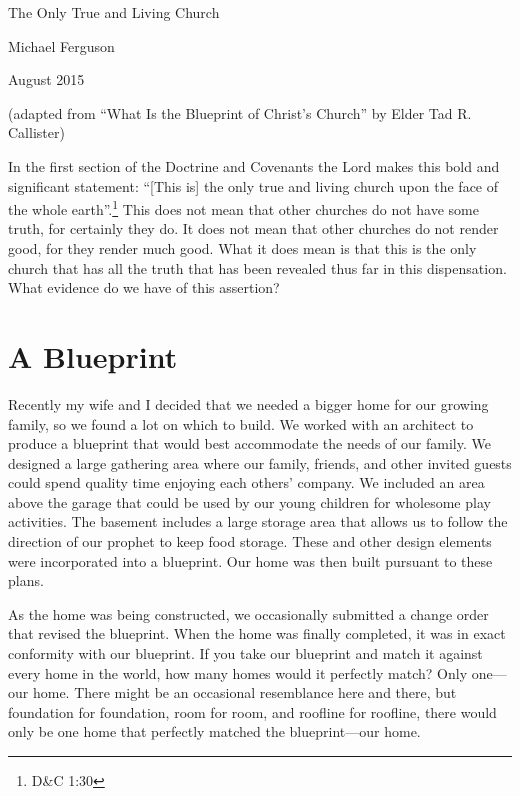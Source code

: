 \documentclass{article}
\begin{document}
\centerline{\sc \large The Only True and Living Church}
\vspace{.5pc}
\centerline{\sc Michael Ferguson}
\centerline{ August 2015}
\vspace{.5pc}
\centerline{\scriptsize (adapted from ``What Is the Blueprint of Christ's Church'' by Elder Tad R. Callister)}
\vspace{6pc}

In the first section of the Doctrine and Covenants the Lord makes this bold and significant statement: ``[This is] the only true and living church upon the face of the whole earth''.\footnote{D\&C 1:30} This does not mean that other churches do not have some truth, for certainly they do. It does not mean that other churches do not render good, for they render much good. What it does mean is that this is the only church that has all the truth that has been revealed thus far in this dispensation. What evidence do we have of this assertion?

\section*{A Blueprint}
Recently my wife and I decided that we needed a bigger home for our growing family, so we found a lot on which to build. We worked with an architect to produce a blueprint that would best accommodate the needs of our family. We designed a large gathering area where our family, friends, and other invited guests could spend quality time enjoying each others' company. We included an area above the garage that could be used by our young children for wholesome play activities. The basement includes a large storage area that allows us to follow the direction of our prophet to keep food storage. These and other design elements were incorporated into a blueprint. Our home was then built pursuant to these plans.

As the home was being constructed, we occasionally submitted a change order that revised the blueprint. When the home was finally completed, it was in exact conformity with our blueprint. If you take our blueprint and match it against every home in the world, how many homes would it perfectly match? Only one---our home. There might be an occasional resemblance here and there, but foundation for foundation, room for room, and roofline for roofline, there would only be one home that perfectly matched the blueprint---our home.
\end{document}
